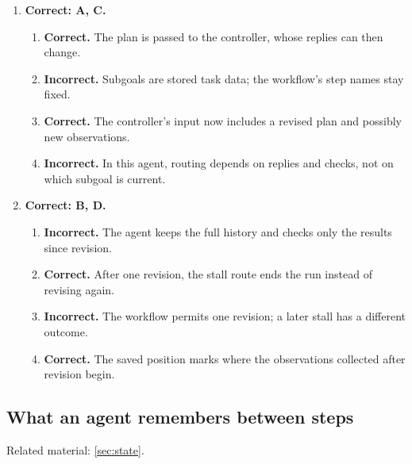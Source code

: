 \begin{enumerate}[start=1,itemsep=0.7\baselineskip]
\item[{\hyperref[exercise:9]{9.}}] \begin{minipage}[t]{\linewidth}
\textbf{Correct: A, C.}
\begin{enumerate}[label=\textnormal{(\Alph*)},leftmargin=*,itemsep=0pt]
\item \textbf{Correct.} The plan is passed to the controller, whose replies can then change.
\item \textbf{Incorrect.} Subgoals are stored task data; the workflow's step names stay fixed.
\item \textbf{Correct.} The controller's input now includes a revised plan and possibly new observations.
\item \textbf{Incorrect.} In this agent, routing depends on replies and checks, not on which subgoal is current.
\end{enumerate}
\end{minipage}

\item[{\hyperref[exercise:10]{10.}}] \begin{minipage}[t]{\linewidth}
\textbf{Correct: B, D.}
\begin{enumerate}[label=\textnormal{(\Alph*)},leftmargin=*,itemsep=0pt]
\item \textbf{Incorrect.} The agent keeps the full history and checks only the results since revision.
\item \textbf{Correct.} After one revision, the stall route ends the run instead of revising again.
\item \textbf{Incorrect.} The workflow permits one revision; a later stall has a different outcome.
\item \textbf{Correct.} The saved position marks where the observations collected after revision begin.
\end{enumerate}
\end{minipage}

\end{enumerate}

\subsection{What an agent remembers between steps}
\noindent Related material: \cref{sec:state}.

